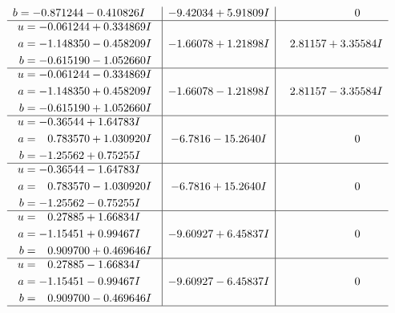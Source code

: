 \documentclass[1p]{elsarticle_modified}
\theoremstyle{definition}
\begin{document}
$$\begin{array}{c|c|c}
\begin{aligned}
b &= -0.871244 - 0.410826 I\end{aligned}
 & -9.42034 + 5.91809 I & \phantom{-0.000000 } 0 \\ \hline\begin{aligned}
u &= -0.061244 + 0.334869 I \\
a &= -1.148350 - 0.458209 I \\
b &= -0.615190 - 1.052660 I\end{aligned}
 & -1.66078 + 1.21898 I & \phantom{-}2.81157 + 3.35584 I \\ \hline\begin{aligned}
u &= -0.061244 - 0.334869 I \\
a &= -1.148350 + 0.458209 I \\
b &= -0.615190 + 1.052660 I\end{aligned}
 & -1.66078 - 1.21898 I & \phantom{-}2.81157 - 3.35584 I \\ \hline\begin{aligned}
u &= -0.36544 + 1.64783 I \\
a &= \phantom{-}0.783570 + 1.030920 I \\
b &= -1.25562 + 0.75255 I\end{aligned}
 & -6.7816 - 15.2640 I & \phantom{-0.000000 } 0 \\ \hline\begin{aligned}
u &= -0.36544 - 1.64783 I \\
a &= \phantom{-}0.783570 - 1.030920 I \\
b &= -1.25562 - 0.75255 I\end{aligned}
 & -6.7816 + 15.2640 I & \phantom{-0.000000 } 0 \\ \hline\begin{aligned}
u &= \phantom{-}0.27885 + 1.66834 I \\
a &= -1.15451 + 0.99467 I \\
b &= \phantom{-}0.909700 + 0.469646 I\end{aligned}
 & -9.60927 + 6.45837 I & \phantom{-0.000000 } 0 \\ \hline\begin{aligned}
u &= \phantom{-}0.27885 - 1.66834 I \\
a &= -1.15451 - 0.99467 I \\
b &= \phantom{-}0.909700 - 0.469646 I\end{aligned}
 & -9.60927 - 6.45837 I & \phantom{-0.000000 } 0\\
 \hline 
 \end{array}$$\newpage$$\begin{array}{c|c|c}  

\end{array}$$
\end{document}
